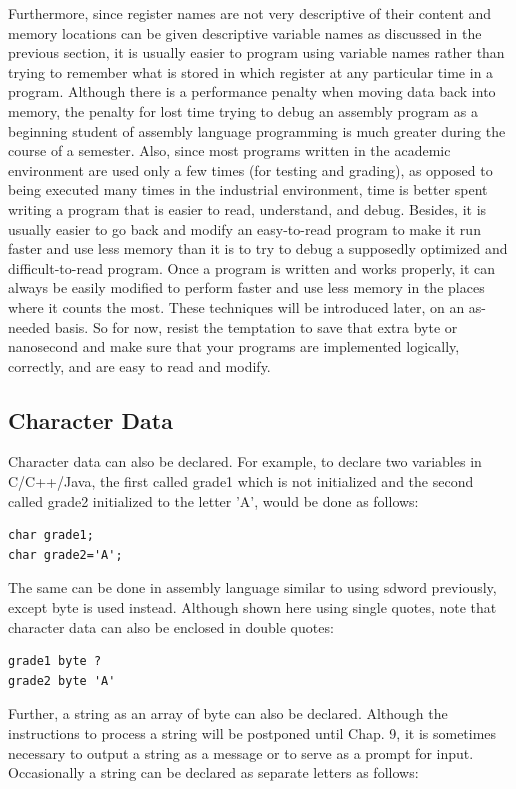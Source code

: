 \documentclass[10pt]{book}
\begin{document}
Furthermore, since register names are not very descriptive of their content and memory locations can be given descriptive variable names as discussed in the previous section, it is usually easier to program using variable names rather than trying to remember what is stored in which register at any particular time in a program. Although there is a performance penalty when moving data back into memory, the penalty for lost time trying to debug an assembly program as a beginning student of assembly language programming is much greater during the course of a semester. Also, since most programs written in the academic environment are used only a few times (for testing and grading), as opposed to being executed many times in the industrial environment, time is better spent writing a program that is easier to read, understand, and debug. Besides, it is usually easier to go back and modify an easy-to-read program to make it run faster and use less memory than it is to try to debug a supposedly optimized and difficult-to-read program. Once a program is written and works properly, it can always be easily modified to perform faster and use less memory in the places where it counts the most. These techniques will be introduced later, on an as-needed basis. So for now, resist the temptation to save that extra byte or nanosecond and make sure that your programs are implemented logically, correctly, and are easy to read and modify.

\subsection{Character Data}
Character data can also be declared. For example, to declare two variables in C/C++/Java, the first called grade1 which is not initialized and the second called grade2 initialized to the letter 'A', would be done as follows:
\begin{verbatim}
char grade1;
char grade2='A';
\end{verbatim}
The same can be done in assembly language similar to using sdword previously, except byte is used instead. Although shown here using single quotes, note that character data can also be enclosed in double quotes:
\begin{verbatim}
grade1 byte ?
grade2 byte 'A'
\end{verbatim}
Further, a string as an array of byte can also be declared. Although the instructions to process a string will be postponed until Chap. 9, it is sometimes necessary to output a string as a message or to serve as a prompt for input. Occasionally a string can be declared as separate letters as follows:
\end{document}
